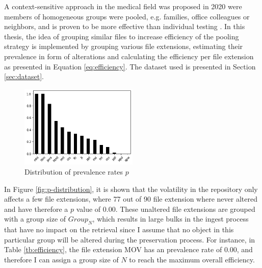 A context-sensitive approach in the medical field was proposed in 2020 were members of homogeneous groups were pooled, e.g. families, office colleagues or neighbors, and is proven to be more effective than individual testing \cite[4]{deckert2020simulation}. In this thesis, the idea of grouping similar files to increase efficiency of the pooling strategy is implemented by grouping various file extensions, estimating their prevalence in form of alterations and calculating the efficiency per file extension as presented in Equation \ref{eq:efficiency}. The dataset used is presented in Section \ref{sec:dataset}.
\begin{figure}[h]%
    \centering
    \caption{Distribution of prevalence rates $p$}\label{fig:pool-sizes}
    \includegraphics[width=0.5\textwidth]{graphics/p-distribution.png}
\end{figure}
In Figure \ref{fig:p-distribution}, it is shown that the volatility in the repository only affects a few file extensions, where 77 out of 90 file extension where never altered and have therefore a $p$ value of 0.00. These unaltered file extensions are grouped with a group size of $Group_N$, which results in large bulks in the ingest process that have no impact on the retrieval since I assume that no object in this particular group will be altered during the preservation process. For instance, in Table \ref{tb:efficiency}, the file extension MOV has an prevalence rate of $0.00$, and therefore I can assign a group size of $N$ to reach the maximum overall efficiency.
